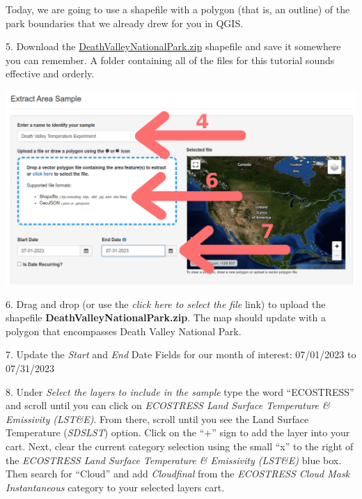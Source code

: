 \documentclass[oneside,a4paper,11pt,explicit]{book}
\begin{document}
Today, we are going to use a shapefile with a polygon (that is, an outline) of the park boundaries that we already drew for you in QGIS.

\vspace{1em}

5. Download the \href{https://jeremydforsythe.github.io/icecream-tutorials/Tutorial4_AccessingRemoteSensingDataWithAppears/DeathValleyNationalPark.zip}{DeathValleyNationalPark.zip} shapefile and save it somewhere you can remember. A folder containing all of the files for this tutorial sounds effective and orderly. 

\centerline{\includegraphics[width=\textwidth]{ExtractDeathValley.png}}

6. Drag and drop (or use the \textit{click here to select the file} link) to upload the shapefile \textbf{DeathValleyNationalPark.zip}. The map should update with a polygon that encompasses Death Valley National Park.

7. Update the \textit{Start} and \textit{End} Date Fields for our month of interest: 07/01/2023 to 07/31/2023


8. Under \textit{Select the layers to include in the sample} type the word ``ECOSTRESS'' and scroll until you can click on \textit{ECOSTRESS Land Surface Temperature \& Emissivity (LST\&E)}. From there, scroll until you see the Land Surface Temperature (\textit{SDS\textunderscore LST}) option. Click on the ``$+$'' sign to add the layer into your cart. Next, clear the current category selection using the small ``x'' to the right of the \textit{ECOSTRESS Land Surface Temperature \& Emissivity (LST\&E)} blue box. Then search for ``Cloud'' and add \textit{Cloud\textunderscore final} from the \textit{ECOSTRESS Cloud Mask Instantaneous} category to your selected layers cart.
\end{document}
